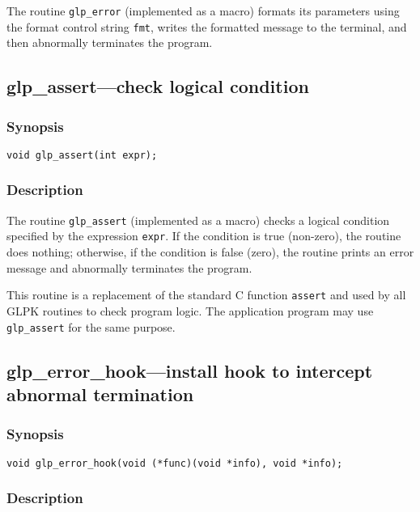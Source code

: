 The routine \verb|glp_error| (implemented as a macro) formats its
parameters using the format control string \verb|fmt|, writes the
formatted message to the terminal, and then abnormally terminates the
program.

\subsection{glp\_assert---check logical condition}

\subsubsection*{Synopsis}

\begin{verbatim}
void glp_assert(int expr);
\end{verbatim}

\subsubsection*{Description}

The routine \verb|glp_assert| (implemented as a macro) checks
a logical condition specified by the expression \verb|expr|. If the
condition is true (non-zero), the routine does nothing; otherwise, if
the condition is false (zero), the routine prints an error message and
abnormally terminates the program.

This routine is a replacement of the standard C function \verb|assert|
and used by all GLPK routines to check program logic. The application
program may use \verb|glp_assert| for the same purpose.

\subsection{glp\_error\_hook---install hook to intercept abnormal
termination}

\subsubsection*{Synopsis}

\begin{verbatim}
void glp_error_hook(void (*func)(void *info), void *info);
\end{verbatim}

\subsubsection*{Description}

